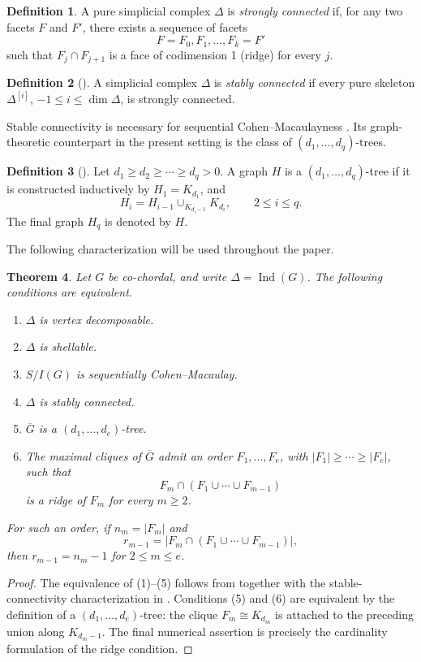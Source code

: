 \documentclass[12pt, reqno]{amsart}
\newtheorem{theorem}{Theorem}[section]
\theoremstyle{definition}
\newtheorem{definition}[theorem]{Definition}
\numberwithin{equation}{section}
\begin{document}
	\begin{definition}
		A pure simplicial complex $\Delta$ is \emph{strongly connected} if, for any two facets $F$ and $F'$, there exists a sequence of facets 
		\[
		F=F_0,F_1,\ldots,F_k=F'
		\]
		such that $F_j\cap F_{j+1}$ is a face of codimension 1 (ridge) for every $j$.
	\end{definition}
	
	\begin{definition}[\cite{namiq2026_icm}]
		A simplicial complex $\Delta$ is \emph{stably connected} if every pure skeleton $\Delta^{[i]}$, $-1\le i\le \dim\Delta$, is strongly connected.
	\end{definition}
	
	Stable connectivity is necessary for sequential Cohen--Macaulayness \cite{namiq2026_icm}. Its graph-theoretic counterpart in the present setting is the class of $(d_1,\ldots,d_q)$-trees.
	
	\begin{definition}[\cite{ahmed2025}]
		Let $d_1\ge d_2\ge\cdots\ge d_q>0$. A graph $H$ is a $(d_1,\ldots,d_q)$-tree if it is constructed inductively by $H_1=K_{d_1}$, and
		\[
		H_i
		=
		H_{i-1}\cup_{K_{d_i-1}} K_{d_i},
		\qquad
		2\le i\le q.
		\]
		The final graph $H_q$ is denoted by $H$.
	\end{definition}
	
	The following characterization will be used throughout the paper.
	
	\begin{theorem}\label{thm:scm_equivalence}
Let $G$ be co-chordal, and write $\Delta=\operatorname{Ind}(G)$.  The following conditions are equivalent.
\begin{enumerate}
\item $\Delta$ is vertex decomposable.
\item $\Delta$ is shellable.
\item $S/I(G)$ is sequentially Cohen--Macaulay.
\item $\Delta$ is stably connected.
\item $\overline G$ is a $(d_1,\ldots,d_e)$-tree.
\item The maximal cliques of $\overline G$ admit an order $F_1,\ldots,F_e$, with $|F_1|\ge\cdots\ge |F_e|$, such that
\[
F_m\cap(F_1\cup\cdots\cup F_{m-1})
\]
is a ridge of $F_m$ for every $m\ge2$.
\end{enumerate}
For such an order, if $n_m=|F_m|$ and
\[
r_{m-1}=\bigl|F_m\cap(F_1\cup\cdots\cup F_{m-1})\bigr|,
\]
then $r_{m-1}=n_m-1$ for $2\le m\le e$.
\end{theorem}
\begin{proof}
The equivalence of (1)--(5) follows from \cite[Theorem~3.2]{ahmed2025} together with the stable-connectivity characterization in \cite[Corollary~5.6]{namiq2026_icm}.  Conditions (5) and (6) are equivalent by the definition of a $(d_1,\ldots,d_e)$-tree: the clique $F_m\cong K_{d_m}$ is attached to the preceding union along $K_{d_m-1}$.  The final numerical assertion is precisely the cardinality formulation of the ridge condition.
\end{proof}
	
\end{document}
